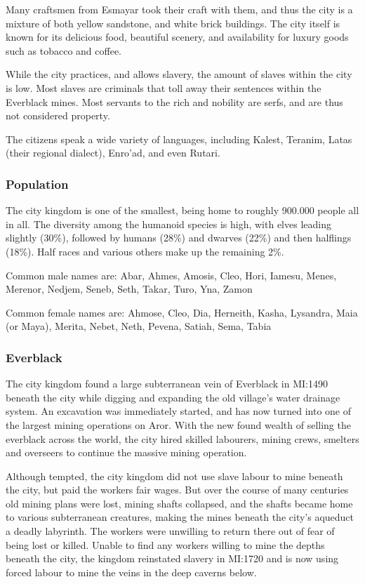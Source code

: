 Many craftsmen from Esmayar took their craft with them, and thus the city is a
mixture of both yellow sandstone, and white brick buildings. The city itself
is known for its delicious food, beautiful scenery, and availability for
luxury goods such as tobacco and coffee.

While the city practices, and allows slavery, the amount of slaves within the
city is low. Most slaves are criminals that toll away their sentences within
the Everblack mines. Most servants to the rich and nobility are serfs, and are
thus not considered property.

The citizens speak a wide variety of languages, including Kalest, Teranim,
Latas (their regional dialect), Enro'ad, and even Rutari.

\subsubsection{Population}

The city kingdom is one of the smallest, being home to roughly 900.000
people all in all. The diversity among the humanoid species is high, with
elves leading slightly (30\%), followed by humans (28\%) and dwarves (22\%)
and then halflings (18\%). Half races and various others make up the remaining
2\%.

Common male names are: Abar, Ahmes, Amosis, Cleo, Hori, Iamesu, Menes,
Merenor, Nedjem, Seneb, Seth, Takar, Turo, Yna, Zamon

Common female names are: Ahmose, Cleo, Dia, Herneith, Kasha, Lysandra, Maia
(or Maya), Merita, Nebet, Neth, Pevena, Satiah, Sema, Tabia

\subsubsection{Everblack}

The city kingdom found a large subterranean vein of Everblack in MI:1490
beneath the city while digging and expanding the old village's water drainage
system. An excavation was immediately started, and has now turned into one of
the largest mining operations on Aror. With the new found wealth of selling
the everblack across the world, the city hired skilled labourers, mining
crews, smelters and overseers to continue the massive mining operation.

Although tempted, the city kingdom did not use slave labour to mine beneath
the city, but paid the workers fair wages. But over the course of many
centuries old mining plans were lost, mining shafts collapsed, and the shafts
became home to various subterranean creatures, making the mines beneath the
city's aqueduct a deadly labyrinth. The workers were unwilling to return
there out of fear of being lost or killed. Unable to find any workers willing
to mine the depths beneath the city, the kingdom reinstated slavery in MI:1720
and is now using forced labour to mine the veins in the deep caverns below.

